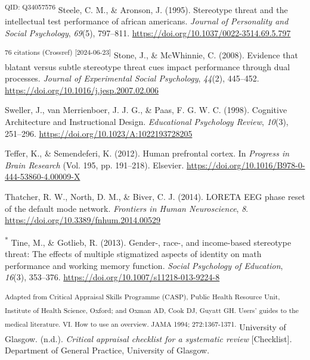 \documentclass[
  stu, a4paper,floatsintext]{apa7}
\newlength{\cslhangindent}
\newenvironment{CSLReferences}[2] %
 {\begin{list}{}{%
  \setlength{\itemindent}{0pt}
  \setlength{\leftmargin}{0pt}
  \setlength{\parsep}{0pt}
  \ifodd #1
   \setlength{\leftmargin}{\cslhangindent}
   \setlength{\itemindent}{-1\cslhangindent}
  \fi
  \setlength{\itemsep}{#2\baselineskip}}}
 {\end{list}}
\begin{document}
\begin{CSLReferences}{1}{0}
\textsuperscript{QID: Q34057576} Steele, C. M., \& Aronson, J. (1995). Stereotype threat and the intellectual test performance of african americans. \emph{Journal of Personality and Social Psychology}, \emph{69}(5), 797--811. \url{https://doi.org/10.1037/0022-3514.69.5.797}

\textsuperscript{76 citations (Crossref) {[}2024-06-23{]}} Stone, J., \& McWhinnie, C. (2008). Evidence that blatant versus subtle stereotype threat cues impact performance through dual processes. \emph{Journal of Experimental Social Psychology}, \emph{44}(2), 445--452. \url{https://doi.org/10.1016/j.jesp.2007.02.006}

Sweller, J., van Merrienboer, J. J. G., \& Paas, F. G. W. C. (1998). Cognitive {Architecture} and {Instructional Design}. \emph{Educational Psychology Review}, \emph{10}(3), 251--296. \url{https://doi.org/10.1023/A:1022193728205}

Teffer, K., \& Semendeferi, K. (2012). Human prefrontal cortex. In \emph{Progress in {Brain Research}} (Vol. 195, pp. 191--218). Elsevier. \url{https://doi.org/10.1016/B978-0-444-53860-4.00009-X}

Thatcher, R. W., North, D. M., \& Biver, C. J. (2014). {LORETA EEG} phase reset of the default mode network. \emph{Frontiers in Human Neuroscience}, \emph{8}. \url{https://doi.org/10.3389/fnhum.2014.00529}

\textsuperscript{*} Tine, M., \& Gotlieb, R. (2013). Gender-, race-, and income-based stereotype threat: The effects of multiple stigmatized aspects of identity on math performance and working memory function. \emph{Social Psychology of Education}, \emph{16}(3), 353--376. \url{https://doi.org/10.1007/s11218-013-9224-8}

\textsuperscript{Adapted from Critical Appraisal Skills Programme (CASP), Public Health Resource Unit, Institute of Health Science, Oxford; and Oxman AD, Cook DJ, Guyatt GH. Users' guides to the medical literature. VI. How to use an overview. JAMA 1994; 272:1367-1371.} University of Glasgow. (n.d.). \emph{Critical appraisal checklist for a systematic review} {[}Checklist{]}. Department of General Practice, University of Glasgow.


\end{CSLReferences}
\end{document}
